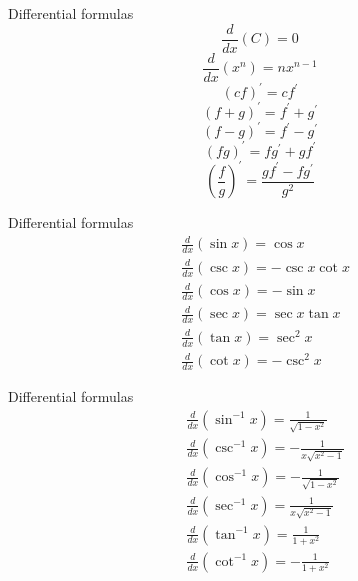 


\begin{frame}{Differential formulas}
    $$
        \frac{d}{d x}(C)=0
    $$$$
        \frac{d}{d x}(x^{n})=n x^{n-1}
    $$$$
        (c f)^{\prime}=c f^{\prime}
    $$$$
        (f+g)^{\prime}=f^{\prime}+g^{\prime}
    $$$$
        (f-g)^{\prime}=f^{\prime}-g^{\prime}
    $$$$
        (f g)^{\prime}=f g^{\prime}+g f^{\prime}
    $$$$
        (\frac{f}{g})^{\prime}=\frac{g f^{\prime}-f g^{\prime}}{g^{2}}
    $$
\end{frame}



\begin{frame}{Differential formulas}
    $$
        \begin{aligned}
             & \frac{d}{d x}(\sin x)=\cos x         \\
             & \frac{d}{d x}(\csc x)=-\csc x \cot x \\
             & \frac{d}{d x}(\cos x)=-\sin x        \\
             & \frac{d}{d x}(\sec x)=\sec x \tan x  \\
             & \frac{d}{d x}(\tan x)=\sec ^{2} x    \\
             & \frac{d}{d x}(\cot x)=-\csc ^{2} x
        \end{aligned}
    $$
\end{frame}



\begin{frame}{Differential formulas}
    $$
        \begin{aligned}
             & \frac{d}{d x}\left(\sin ^{-1} x\right)=\frac{1}{\sqrt{1-x^{2}}}    \\
             & \frac{d}{d x}\left(\csc ^{-1} x\right)=-\frac{1}{x \sqrt{x^{2}-1}} \\
             & \frac{d}{d x}\left(\cos ^{-1} x\right)=-\frac{1}{\sqrt{1-x^{2}}}   \\
             & \frac{d}{d x}\left(\sec ^{-1} x\right)=\frac{1}{x \sqrt{x^{2}-1}}  \\
             & \frac{d}{d x}\left(\tan ^{-1} x\right)=\frac{1}{1+x^{2}}           \\
             & \frac{d}{d x}\left(\cot ^{-1} x\right)=-\frac{1}{1+x^{2}}
        \end{aligned}
    $$
\end{frame}



